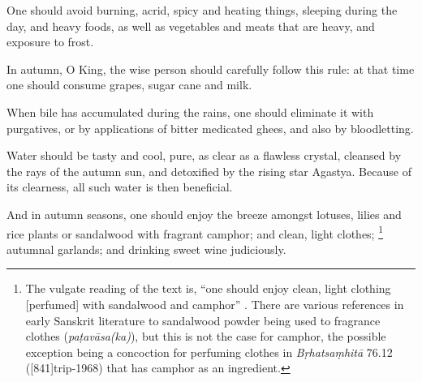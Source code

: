 \begin{translation}
	\item[20]
	One should avoid burning, acrid, spicy and heating things, sleeping during the day, and heavy foods, as well as vegetables and meats that are heavy, and exposure to frost.


	\item[21] %
	In autumn, O King, the wise person should carefully follow this rule:
	at that time one should consume grapes, sugar cane and milk. %

	\item[22] %
	When bile has accumulated during the rains, one should eliminate it with purgatives, or by applications of bitter medicated ghees, and also by bloodletting.

	\item[23] %
	Water should be tasty and cool, pure, as clear as a flawless crystal, cleansed by the rays of the autumn sun, and detoxified by the rising star Agastya. Because of its clearness, all such water is then beneficial.



	\item[24] %
	And in autumn seasons, one should enjoy the breeze amongst lotuses, lilies and rice plants or sandalwood with fragrant camphor; and clean, light clothes;%
	\footnote{The vulgate reading of the text is, ``one should enjoy clean, light clothing [perfumed] with sandalwood and camphor'' \citep[809]{vulgate}. There are various references in early Sanskrit literature to sandalwood powder being used to fragrance clothes (\emph{paṭavāsa(ka)}), but this is not the case for camphor, the possible exception being a concoction for perfuming clothes in \emph{Bṛhatsaṃhitā} 76.12 ([841]{trip-1968}) that has camphor as an ingredient.} %
	autumnal garlands; and drinking sweet wine judiciously.


\end{translation}
